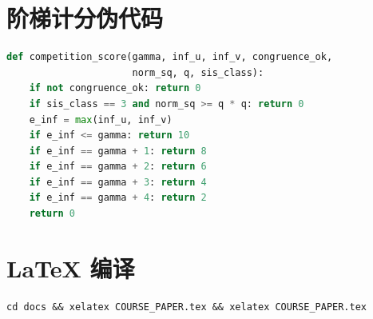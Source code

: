 \documentclass[12pt,a4paper]{ctexart}
\newcommand{\refzi}{\zihao{5}}
\begin{document}
\section{阶梯计分伪代码}
\refzi
\begin{lstlisting}[language=Python]
def competition_score(gamma, inf_u, inf_v, congruence_ok,
                      norm_sq, q, sis_class):
    if not congruence_ok: return 0
    if sis_class == 3 and norm_sq >= q * q: return 0
    e_inf = max(inf_u, inf_v)
    if e_inf <= gamma: return 10
    if e_inf == gamma + 1: return 8
    if e_inf == gamma + 2: return 6
    if e_inf == gamma + 3: return 4
    if e_inf == gamma + 4: return 2
    return 0
\end{lstlisting}

\section{LaTeX 编译}
\refzi
\begin{verbatim}
cd docs && xelatex COURSE_PAPER.tex && xelatex COURSE_PAPER.tex
\end{verbatim}
\end{document}
